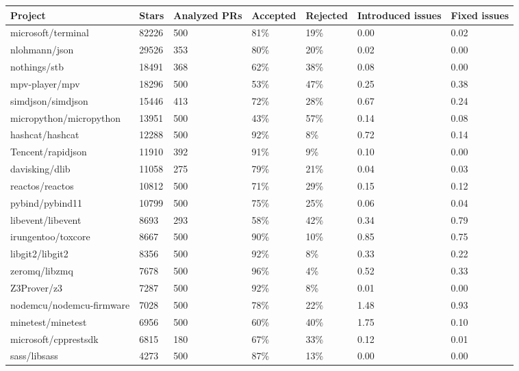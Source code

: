 \begin{tabular}{|p{3.5cm}p{1.5cm}p{1.5cm}p{1.5cm}p{1.5cm}p{1.5cm}p{1cm}|}
  \hline
Project & Stars & Analyzed PRs & Accepted & Rejected & Introduced issues & Fixed issues \\ 
  \hline \hline
microsoft/terminal & 82226 & 500 & 81\% & 19\% & 0.00 & 0.02 \\ 
  nlohmann/json & 29526 & 353 & 80\% & 20\% & 0.02 & 0.00 \\ 
  nothings/stb & 18491 & 368 & 62\% & 38\% & 0.08 & 0.00 \\ 
  mpv-player/mpv & 18296 & 500 & 53\% & 47\% & 0.25 & 0.38 \\ 
  simdjson/simdjson & 15446 & 413 & 72\% & 28\% & 0.67 & 0.24 \\ 
  micropython/micropython & 13951 & 500 & 43\% & 57\% & 0.14 & 0.08 \\ 
  hashcat/hashcat & 12288 & 500 & 92\% & 8\% & 0.72 & 0.14 \\ 
  Tencent/rapidjson & 11910 & 392 & 91\% & 9\% & 0.10 & 0.00 \\ 
  davisking/dlib & 11058 & 275 & 79\% & 21\% & 0.04 & 0.03 \\ 
  reactos/reactos & 10812 & 500 & 71\% & 29\% & 0.15 & 0.12 \\ 
  pybind/pybind11 & 10799 & 500 & 75\% & 25\% & 0.06 & 0.04 \\ 
  libevent/libevent & 8693 & 293 & 58\% & 42\% & 0.34 & 0.79 \\ 
  irungentoo/toxcore & 8667 & 500 & 90\% & 10\% & 0.85 & 0.75 \\ 
  libgit2/libgit2 & 8356 & 500 & 92\% & 8\% & 0.33 & 0.22 \\ 
  zeromq/libzmq & 7678 & 500 & 96\% & 4\% & 0.52 & 0.33 \\ 
  Z3Prover/z3 & 7287 & 500 & 92\% & 8\% & 0.01 & 0.00 \\ 
  nodemcu/nodemcu-firmware & 7028 & 500 & 78\% & 22\% & 1.48 & 0.93 \\ 
  minetest/minetest & 6956 & 500 & 60\% & 40\% & 1.75 & 0.10 \\ 
  microsoft/cpprestsdk & 6815 & 180 & 67\% & 33\% & 0.12 & 0.01 \\ 
  sass/libsass & 4273 & 500 & 87\% & 13\% & 0.00 & 0.00 \\ 
   \hline
\end{tabular}
